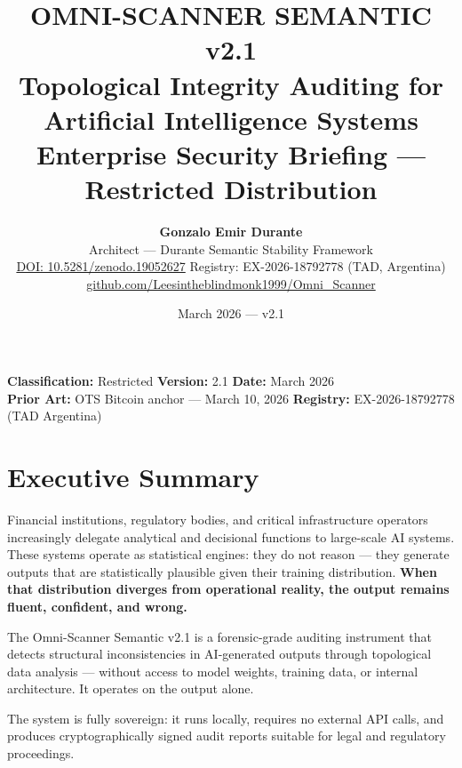 \documentclass[11pt, a4paper]{article}
\title{%
  {\Large\bfseries\color{darkgray} OMNI-SCANNER SEMANTIC v2.1}\\[6pt]
  {\large\color{duranteamber}
    Topological Integrity Auditing for Artificial Intelligence Systems}\\[4pt]
  {\normalsize\color{darkgray}
    Enterprise Security Briefing --- Restricted Distribution}
}
\author{%
  \textbf{Gonzalo Emir Durante}\\
  \small Architect --- Durante Semantic Stability Framework\\
  \small \href{https://zenodo.org/records/19052627}{DOI: 10.5281/zenodo.19052627}
  \quad Registry: EX-2026-18792778 (TAD, Argentina)\\
  \small \href{https://github.com/Leesintheblindmonk1999/Omni_Scanner}%
    {github.com/Leesintheblindmonk1999/Omni\_Scanner}
}
\date{March 2026 --- v2.1}
\begin{document}

\maketitle
\thispagestyle{fancy}

\begin{center}
\end{center}
\vspace{4pt}

\begin{statbox}
\centering
\textbf{Classification:} Restricted \quad
\textbf{Version:} 2.1 \quad
\textbf{Date:} March 2026\\
\textbf{Prior Art:} OTS Bitcoin anchor --- March 10, 2026 \quad
\textbf{Registry:} EX-2026-18792778 (TAD Argentina)
\end{statbox}

\newpage

\hypertarget{sec:en}{}

\section*{\color{darkgray}Executive Summary}

\begin{statbox}
Financial institutions, regulatory bodies, and critical infrastructure operators
increasingly delegate analytical and decisional functions to large-scale AI
systems. These systems operate as statistical engines: they do not reason ---
they generate outputs that are statistically plausible given their training
distribution. \textbf{When that distribution diverges from operational reality,
the output remains fluent, confident, and wrong.}

The Omni-Scanner Semantic v2.1 is a forensic-grade auditing instrument that
detects structural inconsistencies in AI-generated outputs through topological
data analysis --- without access to model weights, training data, or internal
architecture. It operates on the output alone.

The system is fully sovereign: it runs locally, requires no external API calls,
and produces cryptographically signed audit reports suitable for legal and
regulatory proceedings.
\end{statbox}
\end{document}
